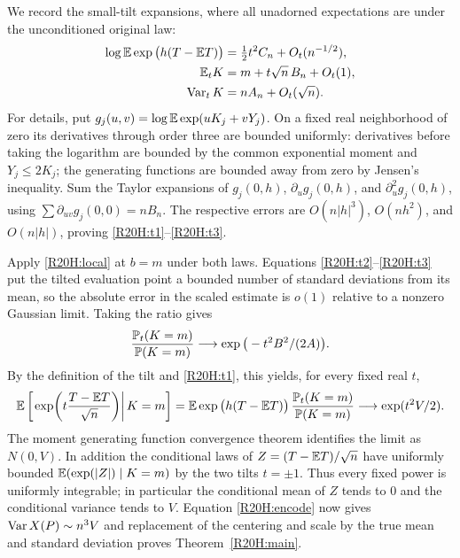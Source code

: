 \documentclass[11pt,a4paper]{article}
\begin{document}
We record the small-tilt expansions, where all unadorned expectations are under the unconditioned original law:
\begin{align}
 \log\mathbb{E}\exp\big(h(T-\mathbb{E} T)\big)&=\tfrac12 t^2 C_n+O_t(n^{-1/2}),\label{R20H:t1}\\
 \mathbb{E}_t K&=m+t\sqrt n\,B_n+O_t(1),\label{R20H:t2}\\
 \operatorname{Var}_t K&=n A_n+O_t(\sqrt n).\label{R20H:t3}
\end{align}
For details, put $g_j(u,v)=\log\mathbb{E}\exp(uK_j+vY_j)$. On a fixed real neighborhood of zero its derivatives through order three are bounded uniformly: derivatives before taking the logarithm are bounded by the common exponential moment and $Y_j\le2K_j$; the generating functions are bounded away from zero by Jensen's inequality. Sum the Taylor expansions of $g_j(0,h)$, $\partial_u g_j(0,h)$, and $\partial_u^2 g_j(0,h)$, using $\sum\partial_{uv}g_j(0,0)=n B_n$. The respective errors are $O(n|h|^3)$, $O(nh^2)$, and $O(n|h|)$, proving \eqref{R20H:t1}--\eqref{R20H:t3}.

Apply \eqref{R20H:local} at $b=m$ under both laws. Equations \eqref{R20H:t2}--\eqref{R20H:t3} put the tilted evaluation point a bounded number of standard deviations from its mean, so the absolute error in the scaled estimate is $o(1)$ relative to a nonzero Gaussian limit. Taking the ratio gives
\[
 \frac{\mathbb{P}_t(K=m)}{\mathbb{P}(K=m)}
 \longrightarrow \exp\big(-t^2 B^2/(2A)\big).
\]
By the definition of the tilt and \eqref{R20H:t1}, this yields, for every fixed real $t$,
\[
 \mathbb{E}\left[\left.\exp\!\left(t\frac{T-\mathbb{E} T}{\sqrt n}\right)\right|K=m\right]
 =\mathbb{E}\exp\big(h(T-\mathbb{E} T)\big)\,
 \frac{\mathbb{P}_t(K=m)}{\mathbb{P}(K=m)}
 \longrightarrow\exp(t^2 V/2).
\]
The moment generating function convergence theorem identifies the limit as $N(0,V)$. In addition the conditional laws of $Z=(T-\mathbb{E} T)/\sqrt n$ have uniformly bounded $\mathbb{E}(\exp(|Z|)\mid K=m)$ by the two tilts $t=\pm1$. Thus every fixed power is uniformly integrable; in particular the conditional mean of $Z$ tends to 0 and the conditional variance tends to $V$. Equation \eqref{R20H:encode} now gives $\operatorname{Var} X(P)\sim n^3V$ and replacement of the centering and scale by the true mean and standard deviation proves Theorem~\ref{R20H:main}.
\end{document}
